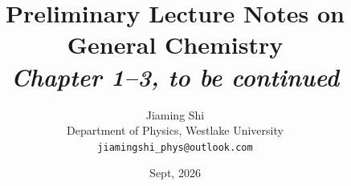 \documentclass{chemistry}
\begin{document}
\title{Preliminary Lecture Notes on General Chemistry\\[0.5em]
       \large\textit{Chapter 1--3, to be continued}}

\author{Jiaming Shi\\[0.3em]
        \small Department of Physics, Westlake University\\
        \small\texttt{jiamingshi\_phys@outlook.com}}

\date{Sept, 2026}
\maketitle

\renewcommand{\contentsname}{Contents}
\tableofcontents








\end{document}
